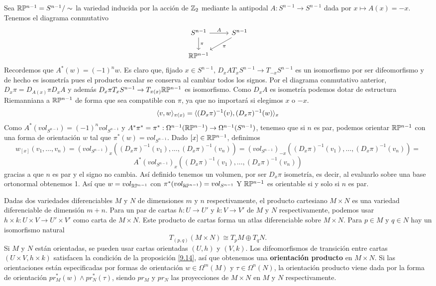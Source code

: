 \documentclass[CV.tex]{subfiles}
\begin{document}
\begin{ej}
Sea $\mathbb{R} \mathbb{P}^{n-1}=S^{n-1}/\sim$ la variedad inducida por la acción de $\mathbb{Z}_2$ mediante la antipodal $A:S^{n-1}\to S^{n-1}$ dada por $x\mapsto A(x)=-x$. Tenemos el diagrama conmutativo
\[
\begin{tikzcd}
S^{n-1}\arrow[r,"A"]\arrow[d, "\pi"] & S^{n-1}\arrow[dl, "\pi"]\\
\R\PP^{n-1} & 
\end{tikzcd}
\]
Recordemos que $A^*(w)=(-1)^nw$. Es claro que, fijado $x\in S^{n-1}$, $D_xA T_xS^{n-1}\to T_{-x}S^{n-1}$ es un isomorfismo por ser difeomorfismo y de hecho es isometría pues el producto escalar se conserva al cambiar todos los signos. Por el diagrama conmutativo anterior, $D_x\pi=D_{A(x)}\pi D_xA$ y además $D_x\pi T_xS^{n-1}\to T_{\pi(x)}\mathbb{R}\mathbb{P}^{n-1}$ es isomorfismo. Como $D_xA$ es isometría podemos dotar de estructura Riemanniana a $\mathbb{R}\mathbb{P}^{n-1}$ de forma que sea compatible con $\pi$, ya que no importará si elegimos $x$ o $-x$.
\[
\langle{v,w}\rangle_{\pi(x)}=\langle{(D_x\pi)^{-1}(v),(D_x\pi)^{-1}(w)}\rangle_x
\]
Como $A^*(vol_{S^{n-1}})=(-1)^nvol_{S^{n-1}}$ y $A^*\pi^*=\pi^*:\Omega^{n-1}(\mathbb{R}\mathbb{P}^{n-1})\to\Omega^{n-1}(S^{n-1})$, tenemso que si $n$ es par, podemos orientar $\mathbb{R}\mathbb{P}^{n-1}$ con una forma de orientación $w$ tal que $\pi^*(w)=vol_{S^{n-1}}$. Dado $[x]\in\mathbb{R}\mathbb{P}^{n-1}$, definimos
\[
w_{[x]}(v_1,\dots, v_n)=(vol_{S^{n-1}})_x((D_x\pi)^{-1}(v_1),\dots, (D_x\pi)^{-1}(v_n))=(vol_{S^{n-1}})_{-x}((D_x\pi)^{-1}(v_1),\dots, (D_x\pi)^{-1}(v_n))=
\] 
\[
A^*(vol_{S^{n-1}})_x((D_x\pi)^{-1}(v_1),\dots, (D_x\pi)^{-1}(v_n))
\]
gracias a que $n$ es par y el signo no cambia. Así definido tenemos un volumen, por ser $D_x\pi$ isometría, es decir, al evaluarlo sobre una base ortonormal obtenemos 1. Así que $w=vol_{\mathbb{R}\mathbb{P}^{n-1}}$ con $\pi^*(vol_{\mathbb{R}\mathbb{P}^{n-1}})=vol_{S^{n-1}}$ Y $\mathbb{R}\mathbb{P}^{n-1}$ es orientable si y solo si $n$ es par.
\end{ej}

\begin{nota}
Dadas dos variedades diferenciables $M$ y $N$ de dimensiones $m$ y $n$ respectivamente, el producto cartesiano $M\times N$ es una variedad diferenciable de dimensión $m+n$. Para un par de cartas $h:U\to U'$ y $k:V\to V'$ de $M$ y $N$ respectivamente, podemos usar $h\times k:U\times V\to U'\times V'$ como carta de $M\times N$. Este producto de cartas forma un atlas diferenciable sobre $M\times N$. Para $p\in M$ y $q\in N$ hay un isomorfismo natural
\[
T_{(p,q)}(M\times N)\cong T_pM\oplus T_qN.
\]
Si $M$ y $N$ están orientadas, se pueden usar cartas orientadas $(U,h)$ y $(V,k)$. Los difeomorfismos de transición entre cartas $(U\times V, h\times k)$ satisfacen la condición de la proposición \ref{9.14}, así que obtenemos una \textbf{orientación producto} en $M\times N$. Si las orientaciones están especificadas por formas de orientación $w\in\Omega^m(M)$ y $\tau\in\Omega^n(N)$, la orientación producto viene dada por la forma de orientación $pr^*_M(w)\land pr^*_N(\tau)$, siendo $pr_M$ y $pr_N$ las proyecciones de $M\times N$ en $M$ y $N$ respectivamente. 
\end{nota}
\end{document}
